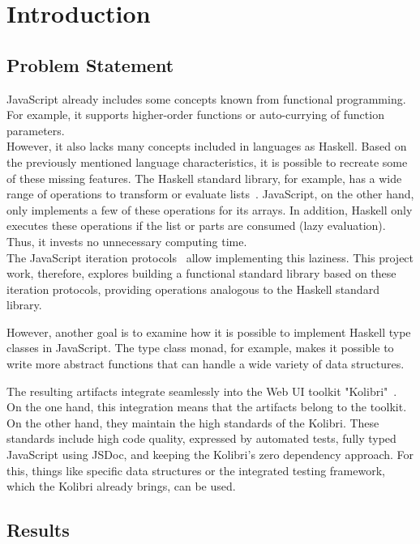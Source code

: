 \chapter{Introduction}
\label{chap:introduction}

\section*{Problem Statement} %
\label{sec:Problem Statement}
JavaScript already includes some concepts known from functional programming.
For example, it supports higher-order functions or auto-currying of function
parameters.\\
However, it also lacks many concepts included in languages as Haskell. Based on
the previously mentioned language characteristics, it is possible to recreate some of
these missing features. The Haskell standard library, for example, has a wide range of
operations to transform or evaluate lists~\cite{haskell_list}. JavaScript, on the other hand, only
implements a few of these operations for its arrays. In addition, Haskell only
executes these operations if the list or parts are consumed (lazy evaluation).
Thus, it invests no unnecessary computing time.\\
The JavaScript iteration protocols~\cite{mdn_protocols} allow implementing this laziness. This
project work, therefore, explores building a functional standard library based
on these iteration protocols, providing operations analogous to the Haskell
standard library.

However, another goal is to examine how it is possible to implement Haskell
type classes in JavaScript. The type class monad, for example, makes it
possible to write more abstract functions that can handle a wide variety of
data structures. 

The resulting artifacts integrate seamlessly into the Web UI toolkit
"Kolibri"~\cite{kolibri}. On the one hand, this integration means that the
artifacts belong to the toolkit. On the other hand, they maintain the high
standards of the Kolibri. These standards include high code quality, expressed
by automated tests, fully typed JavaScript using JSDoc, and keeping the
Kolibri's zero dependency approach. For this, things like specific data
structures or the integrated testing framework, which the Kolibri already
brings, can be used.

\section*{Results} %
\label{sec:Introduction_Results}

